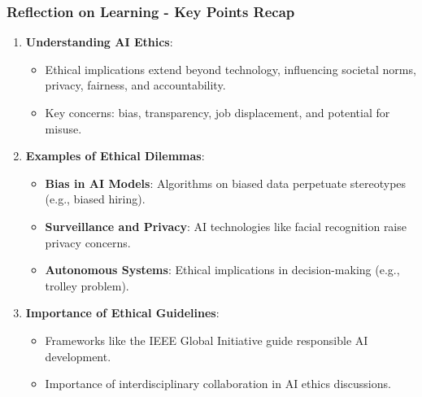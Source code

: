 \documentclass[aspectratio=169]{beamer}
\begin{document}
\begin{frame}[fragile]
    \frametitle{Reflection on Learning - Key Points Recap}
    \begin{enumerate}
        \item \textbf{Understanding AI Ethics}: 
        \begin{itemize}
            \item Ethical implications extend beyond technology, influencing societal norms, privacy, fairness, and accountability.
            \item Key concerns: bias, transparency, job displacement, and potential for misuse.
        \end{itemize}
        
        \item \textbf{Examples of Ethical Dilemmas}:
        \begin{itemize}
            \item \textbf{Bias in AI Models}: Algorithms on biased data perpetuate stereotypes (e.g., biased hiring).
            \item \textbf{Surveillance and Privacy}: AI technologies like facial recognition raise privacy concerns.
            \item \textbf{Autonomous Systems}: Ethical implications in decision-making (e.g., trolley problem).
        \end{itemize}
        
        \item \textbf{Importance of Ethical Guidelines}:
        \begin{itemize}
            \item Frameworks like the IEEE Global Initiative guide responsible AI development.
            \item Importance of interdisciplinary collaboration in AI ethics discussions.
        \end{itemize}
    \end{enumerate}
\end{frame}
\end{document}
